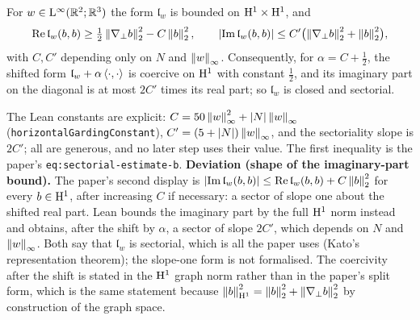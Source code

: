 \begin{lemma}
  \label{lem:local:garding}
  \leanok
  For $w\in\mathrm{L}^\infty(\mathbb{R}^2;\mathbb{R}^3)$ the form $\mathfrak l_w$ is bounded on
  $\mathrm{H}^1\times\mathrm{H}^1$, and
  \[
    \operatorname{Re}\mathfrak l_w(b,b)\geq\tfrac12\left\|\nabla_\perp b\right\|_2^2-C\left\|b\right\|_2^2,
    \qquad
    \left\lvert\operatorname{Im}\mathfrak l_w(b,b)\right\rvert\leq C'\bigl(\left\|\nabla_\perp b\right\|_2^2+\left\|b\right\|_2^2\bigr),
  \]
  with $C,C'$ depending only on $N$ and $\left\|w\right\|_\infty$.  Consequently, for
  $\alpha=C+\tfrac12$, the shifted form $\mathfrak l_w+\alpha\left\langle\cdot,\cdot\right\rangle$ is coercive on
  $\mathrm{H}^1$ with constant $\tfrac12$, and its imaginary part on the diagonal is at most $2C'$
  times its real part; so $\mathfrak l_w$ is closed and sectorial.
\end{lemma}

The Lean constants are explicit: $C=50\left\|w\right\|_\infty^2+\left\lvert N\right\rvert\left\|w\right\|_\infty$
(\texttt{horizontalGardingConstant}), $C'=(5+\left\lvert N\right\rvert)\left\|w\right\|_\infty$, and the sectoriality
slope is $2C'$; all are generous, and no later step uses their value.  The first inequality
is the paper's \texttt{eq:sectorial-estimate-b}.  \textbf{Deviation (shape of the
imaginary-part bound).}  The paper's second display is
$\left\lvert\operatorname{Im}\mathfrak l_w(b,b)\right\rvert\leq\operatorname{Re}\mathfrak l_w(b,b)+C\left\|b\right\|_2^2$ for every $b\in\mathrm{H}^1$,
after increasing $C$ if necessary: a sector of slope one about the shifted real part.  Lean
bounds the imaginary part by the full $\mathrm{H}^1$ norm instead and obtains, after the shift by
$\alpha$, a sector of slope $2C'$, which depends on $N$ and $\left\|w\right\|_\infty$.  Both say that
$\mathfrak l_w$ is sectorial, which is all the paper uses (Kato's representation theorem);
the slope-one form is not formalised.  The coercivity after the shift is stated in the
$\mathrm{H}^1$ graph norm rather than in the paper's split form, which is the same statement because
$\left\|b\right\|_{\mathrm{H}^1}^2=\left\|b\right\|_2^2+\left\|\nabla_\perp b\right\|_2^2$ by construction of the graph
space.

